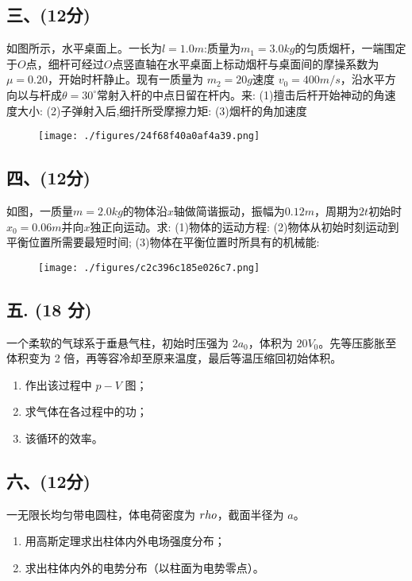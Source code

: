 \subsection{三、(12分)}
如图所示，水平桌面上。一长为$l = 1.0m$:质量为$m_1 = 3.0kg$的匀质烟杆，一端围定于$O$点，细杆可经过$O$点竖直轴在水平桌面上标动烟杆与桌面间的摩操系数为$\mu=0.20$，开始时杆静止。现有一质量为 $m_2 = 20g$速度 $v_0 = 400m/s$，沿水平方向以与杆成$\theta = 30^\circ$常射入杆的中点日留在杆内。来:
(1)擅击后杆开始神动的角速度大小:
(2)子弹射入后,细扦所受摩擦力矩:
(3)烟杆的角加速度
\begin{figure}[ht]
\centering
\texttt{[image: ./figures/24f68f40a0af4a39.png]}
\caption{} \label{fig_NJU10_5}
\end{figure}
\subsection{四、(12分)}
如图，一质量$m=2.0kg$的物体沿$x$轴做简谐振动，振幅为$0.12m$，周期为$2t$初始时$x_0=0.06m$并向$x$独正向运动。求:
(1)物体的运动方程:
(2)物体从初始时刻运动到平衡位置所需要最短时间;
(3)物体在平衡位置时所具有的机械能:
\begin{figure}[ht]
\centering
\texttt{[image: ./figures/c2c396c185e026c7.png]}
\caption{} \label{fig_NJU10_6}
\end{figure}
\subsection{五. (18 分)}
一个柔软的气球系于垂悬气柱，初始时压强为 $2a_0$，体积为 $20V_0$。先等压膨胀至体积变为 2 倍，再等容冷却至原来温度，最后等温压缩回初始体积。
\begin{enumerate}
    \item 作出该过程中 $p-V$ 图；
    \item 求气体在各过程中的功；
    \item 该循环的效率。
\end{enumerate}

\subsection{六、(12分)}
一无限长均匀带电圆柱，体电荷密度为 $\\rho$，截面半径为 $a$。

\begin{enumerate}
    \item 用高斯定理求出柱体内外电场强度分布；
    \item 求出柱体内外的电势分布（以柱面为电势零点）。
\end{enumerate}
